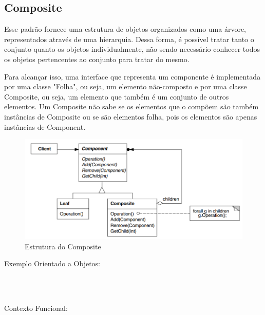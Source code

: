 \subsection{Composite}

Esse padrão fornece uma estrutura de objetos organizados como uma 
árvore, representados através de uma hierarquia. Dessa forma, é 
possível tratar tanto o conjunto quanto os objetos individualmente, 
não sendo necessário conhecer todos os objetos pertencentes ao conjunto 
para tratar do mesmo.

Para alcançar isso, uma interface que representa um componente é 
implementada por uma classe "Folha", ou seja, um elemento não-composto 
e por uma classe Composite, ou seja, um elemento que também é um 
conjunto de outros elementos. Um Composite não sabe se os elementos 
que o compõem são também instâncias de Composite ou se são elementos 
folha, pois os elementos são apenas instâncias de Component.

\begin{figure}[htb]
	\caption{\label{fig_grafico}Estrutura do Composite}
	\begin{center}
	    \includegraphics[scale=0.5]{5_padroes-contexto-funcional/5.2_estruturais/5.2.3_composite/diagram.png}
	\end{center}
\end{figure}

Exemplo Orientado a Objetos:

\begin{lstlisting}[caption={Composite Orientado a Objetos},label=oocomposite]



\end{lstlisting}

Contexto Funcional:



\begin{lstlisting}[caption={Composite Funcional},label=fpcomposite]
    

    
\end{lstlisting}